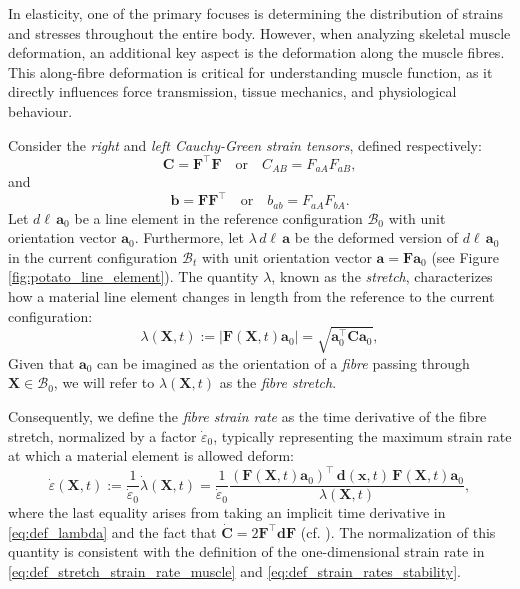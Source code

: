 \documentclass{sfuthesis}
\numberwithin{equation}{section}
\numberwithin{figure}{chapter}
\numberwithin{table}{chapter}
\theoremstyle{definition}
\def\*#1{{\mathbf{#1}}} %
\newcommand{\depsilon}{\dot{\varepsilon}}
\newcommand{\B}{\mathcal{B}}
\newcommand{\T}{\top}
\begin{document}
In elasticity, one of the primary focuses is determining the distribution of strains and stresses throughout the entire body. However, when analyzing skeletal muscle deformation, an additional key aspect is the deformation along the muscle fibres. This along-fibre deformation is critical for understanding muscle function, as it directly influences force transmission, tissue mechanics, and physiological behaviour. 

Consider the \textit{right} and \textit{left Cauchy-Green strain tensors}, defined respectively:
\begin{equation}
    \*C = \*F^\T \*F \quad \text{or} \quad C_{AB} = F_{aA} F_{aB},
\end{equation}
and
\begin{equation}
    \*b = \*F \*F^\T \quad \text{or} \quad b_{ab} = F_{aA} F_{bA}.
\end{equation}
Let $d\ell \,\*a_0$ be a line element in the reference configuration $\B_0$ with unit orientation vector $\*a_0$. Furthermore, let $\lambda \, d\ell \, \*a$ be the deformed version of $d\ell \,\*a_0$ in the current configuration $\B_t$ with unit orientation vector $\*a = \*F \*a_0$ (see Figure \ref{fig:potato_line_element}). The quantity $\lambda$, known as the \textit{stretch}, characterizes how a material line element changes in length from the reference to the current configuration:
\begin{equation} \label{eq:def_lambda}
\lambda(\*X,t) := |\*F(\*X,t) \*a_0| = \sqrt{\*a_0^\T \*C \*a_0},
\end{equation}
Given that $\*a_0$ can be imagined as the orientation of a \textit{fibre} passing through $\*X \in \B_0$, we will refer to $\lambda(\*X,t)$ as the \textit{fibre stretch}. 

Consequently, we define the \textit{fibre strain rate} as the time derivative of the fibre stretch, normalized by a factor $\depsilon_0$, typically representing the maximum strain rate at which a material element is allowed deform:
\begin{equation} \label{eq:def_epsilon}
\depsilon(\*X,t) := \dfrac{1}{\depsilon_0} \dot{\lambda}(\*X,t) = \dfrac{1}{\depsilon_0} \dfrac{(\*F(\*X,t)  \*a_0)^\T \, \*d(\*x,t)  \, \*F(\*X,t)  \*a_0}{\lambda(\*X,t)},
\end{equation}
where the last equality arises from taking an implicit time derivative in \eqref{eq:def_lambda} and the fact that $\dot{\*C} = 2\*F^\T \*d \*F$ (cf. \cite[Eq. (2.168)]{HolzapfelBook}). The normalization of this quantity is consistent with the definition of the one-dimensional strain rate in \eqref{eq:def_stretch_strain_rate_muscle} and \eqref{eq:def_strain_rates_stability}.
\end{document}

